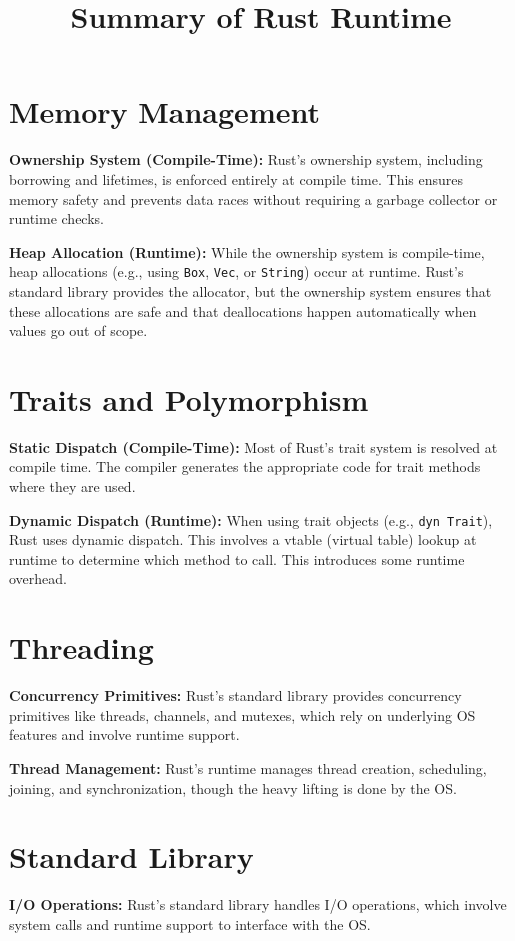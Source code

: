 \documentclass{article}
\title{Summary of Rust Runtime}
\date{}
\begin{document}
\maketitle

\section{Memory Management}
\textbf{Ownership System (Compile-Time):} Rust's ownership system, including borrowing and lifetimes, is enforced entirely at compile time. This ensures memory safety and prevents data races without requiring a garbage collector or runtime checks.

\textbf{Heap Allocation (Runtime):} While the ownership system is compile-time, heap allocations (e.g., using \texttt{Box}, \texttt{Vec}, or \texttt{String}) occur at runtime. Rust’s standard library provides the allocator, but the ownership system ensures that these allocations are safe and that deallocations happen automatically when values go out of scope.

\section{Traits and Polymorphism}
\textbf{Static Dispatch (Compile-Time):} Most of Rust’s trait system is resolved at compile time. The compiler generates the appropriate code for trait methods where they are used.

\textbf{Dynamic Dispatch (Runtime):} When using trait objects (e.g., \texttt{dyn Trait}), Rust uses dynamic dispatch. This involves a vtable (virtual table) lookup at runtime to determine which method to call. This introduces some runtime overhead.

\section{Threading}
\textbf{Concurrency Primitives:} Rust’s standard library provides concurrency primitives like threads, channels, and mutexes, which rely on underlying OS features and involve runtime support.

\textbf{Thread Management:} Rust’s runtime manages thread creation, scheduling, joining, and synchronization, though the heavy lifting is done by the OS.

\section{Standard Library}
\textbf{I/O Operations:} Rust’s standard library handles I/O operations, which involve system calls and runtime support to interface with the OS.
\end{document}
